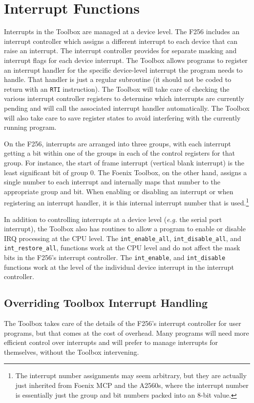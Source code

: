 \section{Interrupt Functions}
Interrupts in the Toolbox are managed at a device level.
The F256 includes an interrupt controller which assigns a different interrupt to each device that can raise an interrupt.
The interrupt controller provides for separate masking and interrupt flags for each device interrupt.
The Toolbox allows programs to register an interrupt handler for the specific device-level interrupt the program needs to handle.
That handler is just a regular subroutine (it should not be coded to return with an \verb+RTI+ instruction).
The Toolbox will take care of checking the various interrupt controller registers to determine which interrupts are currently pending
and will call the associated interrupt handler automatically. The Toolbox will also take care to save register states to avoid interfering
with the currently running program.

On the F256, interrupts are arranged into three groups, with each interrupt getting a bit within one of the groups in each of the 
control registers for that group. For instance, the start of frame interrupt (vertical blank interrupt) is the least significant bit of group 0.
The Foenix Toolbox, on the other hand, assigns a single number to each interrupt and internally maps that number to the appropriate group and bit.
When enabling or disabling an interrupt or when registering an interrupt handler, it is this internal interrupt number that is used.\footnote{The interrupt
number assignments may seem arbitrary, but they are actually just inherited from Foenix MCP and the A2560s, where the interrupt number is essentially just
the group and bit numbers packed into an 8-bit value.}

In addition to controlling interrupts at a device level ({\it e.g.} the serial port interrupt), the Toolbox also has routines to allow a program to
enable or disable IRQ processing at the CPU level. The \lstinline!int_enable_all!, \lstinline!int_disable_all!, and \lstinline!int_restore_all!,
functions work at the CPU level and do not affect the mask bits in the F256's interrupt controller. The \lstinline!int_enable!, and \lstinline!int_disable!
functions work at the level of the individual device interrupt in the interrupt controller. 
 
\subsection*{Overriding Toolbox Interrupt Handling}
The Toolbox takes care of the details of the F256's interrupt controller for user programs, but that comes at the cost of overhead.
Many programs will need more efficient control over interrupts and will prefer to manage interrupts for themselves, without the 
Toolbox intervening.

